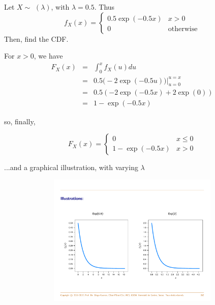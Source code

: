 \documentclass[notes=show,smaller,handout]{beamer}\usepackage[]{graphicx}\usepackage[]{color}
\begin{document}
\begin{frame}{\subsecname}
  \begin{small}
  \begin{example}
  Let $X\sim$ $(\lambda)$, with $\lambda =0.5$. Thus
  $$f_X(x) = \left\{ \begin{array}{ll}
  0.5 \exp (-0.5x) & x>0\\
  0 & \text{otherwise}
  \end{array} \right.$$
  Then, find the CDF.
  \medskip

  For $x>0$, we have
  \begin{eqnarray*}
  F_{X}(x) & = & \int_{0}^{x}f_{X}(u)du\\
  & = & 0.5\Big( -2\exp (-0.5u)\Big) \bigl|_{u=0}^{u=x}\\
  & = & 0.5(-2\exp (-0.5x)+2\exp (0))\\
  & = & 1-\exp (-0.5x)
  \end{eqnarray*}

  so, finally,

  $$F_X(x) = \left\{ \begin{array}{ll}
  0 & x \leq 0 \\
  1-\exp (-0.5x)& x>0
  \end{array} \right.$$
  \end{example}
  \end{small}
\end{frame}

\begin{frame}{\subsecname}
  \begin{example} [continued]

  ...and a graphical illustration, with varying $\lambda$

  \begin{figure}[ptb]\centering
  \includegraphics[height=2.4856in, width=4.5in]{img/Exp_Diego.pdf}%
  \end{figure}%

  \end{example}
\end{frame}
\end{document}
